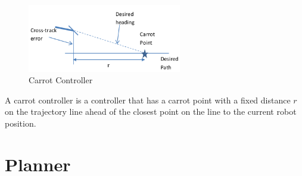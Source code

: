 \documentclass{article}
\begin{document}
\begin{figure}[H]
	\centering
	\includegraphics[width=0.6\textwidth]{images/carrot_controller.png}
	\caption{Carrot Controller}
	\label{fig:carrot_controller}
\end{figure}

A carrot controller is a controller that has a carrot point with a fixed distance $r$ on the trajectory line ahead of the closest point on the line to the current robot position.


\newpage
\section{Planner}
\end{document}
